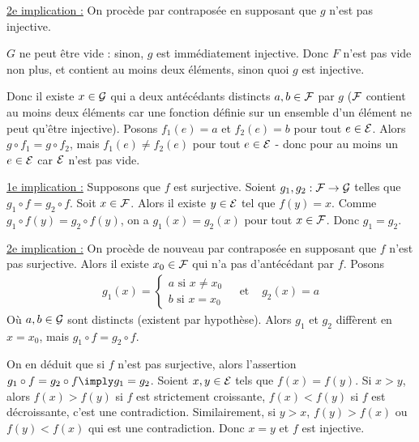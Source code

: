 \documentclass[]{../templates/homework}
\begin{document}
\underline{2e implication :} On procède par contraposée en supposant que $g$ n'est pas injective.

$G$ ne peut être vide : sinon, $g$ est immédiatement injective. Donc $F$ n'est pas vide non plus, et contient au moins deux éléments, sinon quoi $g$ est injective.

Donc il existe $x\in\mathcal G$ qui a deux antécédants distincts $a,b\in\mathcal F$ par $g$ ($\mathcal F$ contient au moins deux éléments car une fonction définie sur un ensemble d'un élément ne peut qu'être injective). Posons $f_{1}(e) = a$ et $f_{2}(e) = b$ pour tout $e\in\mathcal E$. Alors $g\circ f_{1} = g\circ f_{2}$, mais $f_{1}(e) \neq f_{2}(e)$ pour tout $e\in\mathcal E$ - donc pour au moins un $e\in\mathcal E$ car $\mathcal E$ n'est pas vide.

\question
\underline{1e implication :} Supposons que $f$ est surjective. Soient $g_{1},g_{2}: \mathcal F\rightarrow \mathcal G$ telles que $g_{1}\circ f = g_{2}\circ f$. Soit $x \in \mathcal F$. Alors il existe $y\in\mathcal E$ tel que $f(y) = x$. Comme $g_{1}\circ f(y) = g_{2}\circ f(y)$, on a $g_{1}(x) = g_{2}(x)$ pour tout $x\in\mathcal F$. Donc $g_{1} = g_{2}$.

\underline{2e implication :} On procède de nouveau par contraposée en supposant que $f$ n'est pas surjective. Alors il existe $x_{0}\in\mathcal F$ qui n'a pas d'antécédant par $f$. Posons
\begin{eqnarray}
  g_{1}(x) =
  \begin{cases}
    a \text{ si } x\neq x_{0} \\
    b \text{ si } x = x_{0}
  \end{cases}
  &\text{  et  }& g_{2}(x) = a
\end{eqnarray}
Où $a,b \in\mathcal G$ sont distincts (existent par hypothèse). Alors $g_{1}$ et $g_{2}$ diffèrent en $x=x_{0}$, mais $g_{1}\circ f = g_{2}\circ f$.

On en déduit que si $f$ n'est pas surjective, alors l'assertion $g_1 \circ f = g_2 \circ f \imply g_1 = g_2$.
\subproblem
Soient $x,y \in \mathcal E$ tels que $f(x) = f(y)$. Si $x>y$, alors $f(x) > f(y)$ si $f$ est strictement croissante, $f(x) < f(y)$ si $f$ est décroissante, c'est une contradiction. Similairement, si $y>x$, $f(y) > f(x)$ ou $f(y) < f(x)$ qui est une contradiction. Donc $x=y$ et $f$ est injective.
\end{document}

